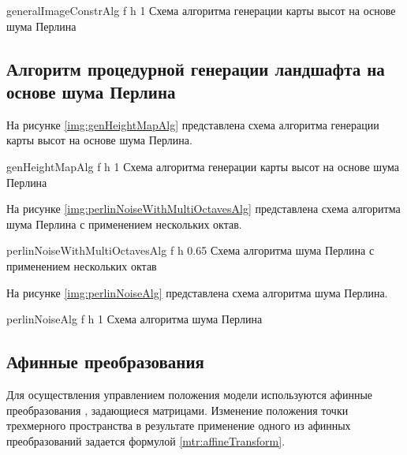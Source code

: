 {generalImageConstrAlg} %
{f} %
{h} %
{1\textwidth} %
{Схема алгоритма генерации карты высот на основе шума Перлина} %

\clearpage

\subsection{Алгоритм процедурной генерации ландшафта на основе шума Перлина}

На рисунке \ref{img:genHeightMapAlg} представлена схема алгоритма генерации карты высот на основе шума Перлина.

{genHeightMapAlg} %
{f} %
{h} %
{1\textwidth} %
{Схема алгоритма генерации карты высот на основе шума Перлина} %

\clearpage

На рисунке \ref{img:perlinNoiseWithMultiOctavesAlg} представлена схема алгоритма шума Перлина с применением нескольких октав.

{perlinNoiseWithMultiOctavesAlg} %
{f} %
{h} %
{0.65\textwidth} %
{Схема алгоритма шума Перлина с применением нескольких октав} %

\clearpage

На рисунке \ref{img:perlinNoiseAlg} представлена схема алгоритма шума Перлина.

{perlinNoiseAlg} %
{f} %
{h} %
{1\textwidth} %
{Схема алгоритма шума Перлина} %

\subsection{Афинные преобразования}

Для осуществления управлением положения модели используются афинные преобразования \cite{info_affineTransform}, задающиеся матрицами.
Изменение положения точки трехмерного пространства в результате применение одного из афинных преобразований задается формулой \ref{mtr:affineTransform}.


